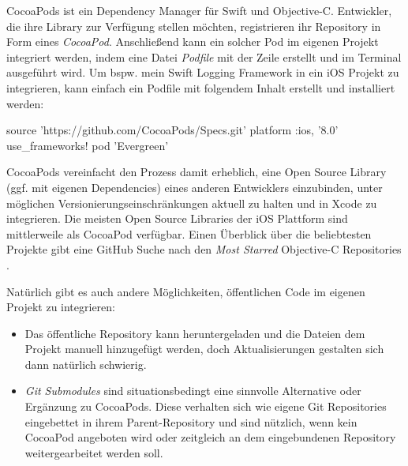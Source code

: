 \documentclass[parskip=half, final]{scrreprt}
\begin{document}
CocoaPods ist ein Dependency Manager für Swift und Objective-C. Entwickler, die ihre Library zur Verfügung stellen möchten, registrieren ihr Repository in Form eines \emph{CocoaPod}. Anschließend kann ein solcher Pod im eigenen Projekt integriert werden, indem eine Datei \emph{Podfile} mit der Zeile  erstellt und im Terminal  ausgeführt wird. Um bspw. mein Swift Logging Framework   in ein iOS Projekt zu integrieren, kann einfach ein Podfile mit folgendem Inhalt erstellt und installiert werden:

\begin{shcode}
source 'https://github.com/CocoaPods/Specs.git'
platform :ios, '8.0'
use_frameworks!
pod 'Evergreen'	
\end{shcode}

CocoaPods vereinfacht den Prozess damit erheblich, eine Open Source Library (ggf. mit eigenen Dependencies) eines anderen Entwicklers einzubinden, unter möglichen Versionierungseinschränkungen aktuell zu halten und in Xcode zu integrieren. Die meisten Open Source Libraries der iOS Plattform sind mittlerweile als CocoaPod verfügbar. Einen Überblick über die beliebtesten Projekte gibt eine GitHub Suche nach den \emph{Most Starred} Objective-C Repositories .

Natürlich gibt es auch andere Möglichkeiten, öffentlichen Code im eigenen Projekt zu integrieren:

\begin{itemize}
\item Das öffentliche Repository kann heruntergeladen und die Dateien dem Projekt manuell hinzugefügt werden, doch Aktualisierungen gestalten sich dann natürlich schwierig.
\item \emph{Git Submodules}  sind situationsbedingt eine sinnvolle Alternative oder Ergänzung zu CocoaPods. Diese verhalten sich wie eigene Git Repositories eingebettet in ihrem Parent-Repository und sind nützlich, wenn kein CocoaPod angeboten wird oder zeitgleich an dem eingebundenen Repository weitergearbeitet werden soll.
\end{itemize}
\end{document}
